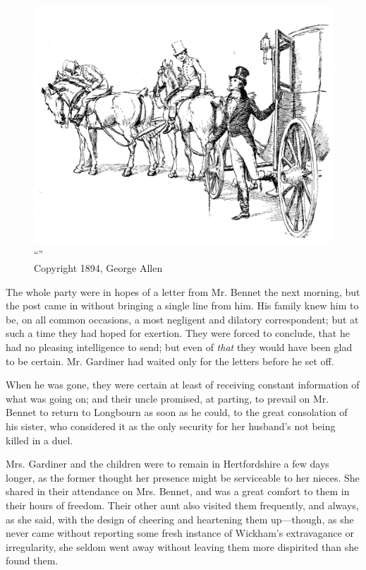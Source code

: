 \begin{figure}[htbp]
    \centering
    \includegraphics[width=\textwidth]{illustrations/i_031.jpg}
    \caption{“”\\ Copyright 1894, George Allen}
    \label{fig:image}
\end{figure}


The whole party were in hopes of a letter from Mr. Bennet the next morning, but the post came in without bringing a single line from him. His family knew him to be, on all common occasions, a most negligent and dilatory correspondent; but at such a time they had hoped for exertion. They were forced to conclude, that he had no pleasing intelligence to send; but even of \textit{that} they would have been glad to be certain. Mr. Gardiner had waited only for the letters before he set off.

When he was gone, they were certain at least of receiving constant information of what was going on; and their uncle promised, at parting, to prevail on Mr. Bennet to return to Longbourn as soon as he could, to the great consolation of his sister, who considered it as the only security for her husband's not being killed in a duel.

Mrs. Gardiner and the children were to remain in Hertfordshire a few days longer, as the former thought her presence might be serviceable to her nieces. She shared in their attendance on Mrs. Bennet, and was a great comfort to them in their hours of freedom. Their other aunt also visited them frequently, and always, as she said, with the design of cheering and heartening them up---though, as she never came without reporting some fresh instance of Wickham's extravagance or irregularity, she seldom went away without leaving them more dispirited than she found them.

